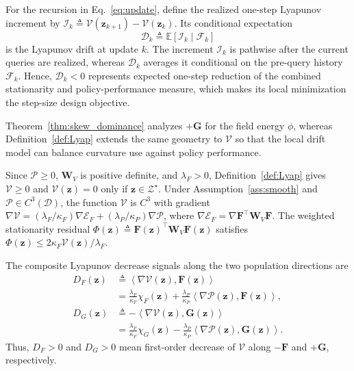 \documentclass[journal]{IEEEtran}
\theoremstyle{remark}
\newcommand{\E}{\mathbb{E}}
\newcommand{\inner}[2]{\left\langle #1,#2\right\rangle}
\newcommand{\cD}{\mathcal{D}}
\newcommand{\bz}{\boldsymbol{z}}
\newcommand{\bW}{\boldsymbol{W}}
\newcommand{\bF}{\boldsymbol{F}}
\newcommand{\bG}{\boldsymbol{G}}
\newcommand{\Vk}{\mathcal{V}}
\newcommand{\cE}{\mathcal{E}}
\newcommand{\cP}{\mathcal{P}}
\begin{document}
	For the recursion in Eq.~\eqref{eq:update}, define the realized one-step Lyapunov increment by $\mathscr I_k\triangleq\Vk(\bz_{k+1})-\Vk(\bz_k)$.
	Its conditional expectation
	\[
	\mathscr D_k\triangleq\E[\mathscr I_k\mid\mathscr F_k]
	\]
	is the Lyapunov drift at update $k$.
	The increment $\mathscr I_k$ is pathwise after the current queries are realized, whereas $\mathscr D_k$ averages it conditional on the pre-query history $\mathscr F_k$.
	Hence, $\mathscr D_k<0$ represents expected one-step reduction of the combined stationarity and policy-performance measure, which makes its local minimization the step-size design objective.
	
	Theorem~\ref{thm:skew_dominance} analyzes $+\bG$ for the field energy $\phi$, whereas Definition~\ref{def:Lyap} extends the same geometry to $\Vk$ so that the local drift model can balance curvature use against policy performance.
	
	Since $\cP\ge0$, $\bW_V$ is positive definite, and $\lambda_F>0$, Definition~\ref{def:Lyap} gives $\Vk\ge0$ and $\Vk(\bz)=0$ only if $\bz\in\mathcal Z^\star$.
	Under Assumption~\ref{ass:smooth} and $\cP\in C^3(\cD)$, the function $\Vk$ is $C^3$ with gradient $\nabla\Vk=(\lambda_F/\kappa_F)\nabla\cE_F +(\lambda_P/\kappa_P)\nabla\cP$, where $\nabla\cE_F=\nabla\bF^{\top}\bW_V\bF$.
	The weighted stationarity residual $\Phi(\bz)\triangleq\bF(\bz)^{\top}\bW_{V}\bF(\bz)$ satisfies $\Phi(\bz)\le2\kappa_{F}\Vk(\bz)/\lambda_{F}$.
	
	The composite Lyapunov decrease signals along the two population directions are
	\begin{equation}\label{eq:composite_signals}
		\begin{aligned}
			D_F(\bz)
			&\triangleq\inner{\nabla\Vk(\bz)}{\bF(\bz)}
			\\[-2pt]
			&=\frac{\lambda_F}{\kappa_F}\chi_F(\bz)
			+\frac{\lambda_P}{\kappa_P}\inner{\nabla\cP(\bz)}{\bF(\bz)},\\
			D_G(\bz)
			&\triangleq-\inner{\nabla\Vk(\bz)}{\bG(\bz)}
			\\[-2pt]
			&=\frac{\lambda_F}{\kappa_F}\chi_G(\bz)
			-\frac{\lambda_P}{\kappa_P}\inner{\nabla\cP(\bz)}{\bG(\bz)}.
		\end{aligned}
	\end{equation}
	Thus, $D_F>0$ and $D_G>0$ mean first-order decrease of $\Vk$ along $-\bF$ and $+\bG$, respectively.
	
\end{document}

